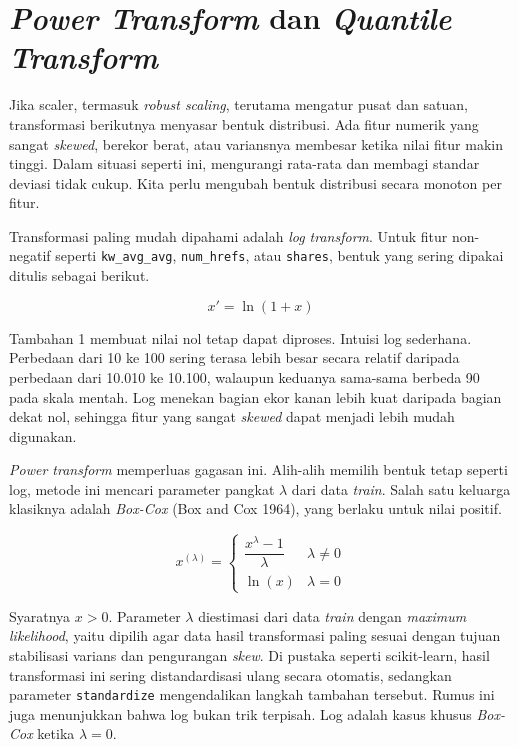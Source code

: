 \section{\texorpdfstring{\emph{Power Transform} dan \emph{Quantile Transform}}{Power Transform dan Quantile Transform}}\label{power-transform-dan-quantile-transform}

Jika scaler, termasuk \emph{robust scaling}, terutama mengatur pusat dan satuan, transformasi berikutnya menyasar bentuk distribusi. Ada fitur numerik yang sangat \emph{skewed}, berekor berat, atau variansnya membesar ketika nilai fitur makin tinggi. Dalam situasi seperti ini, mengurangi rata-rata dan membagi standar deviasi tidak cukup. Kita perlu mengubah bentuk distribusi secara monoton per fitur.

Transformasi paling mudah dipahami adalah \emph{log transform}. Untuk fitur non-negatif seperti \passthrough{\lstinline!kw_avg_avg!}, \passthrough{\lstinline!num_hrefs!}, atau \passthrough{\lstinline!shares!}, bentuk yang sering dipakai ditulis sebagai berikut.

\[
x' = \ln(1 + x)
\]

Tambahan 1 membuat nilai nol tetap dapat diproses. Intuisi log sederhana. Perbedaan dari 10 ke 100 sering terasa lebih besar secara relatif daripada perbedaan dari 10.010 ke 10.100, walaupun keduanya sama-sama berbeda 90 pada skala mentah. Log menekan bagian ekor kanan lebih kuat daripada bagian dekat nol, sehingga fitur yang sangat \emph{skewed} dapat menjadi lebih mudah digunakan.

\emph{Power transform} memperluas gagasan ini. Alih-alih memilih bentuk tetap seperti log, metode ini mencari parameter pangkat \(\lambda\) dari data \emph{train}. Salah satu keluarga klasiknya adalah \emph{Box-Cox} (Box and Cox 1964), yang berlaku untuk nilai positif.

\[
x^{(\lambda)} = \begin{cases} \dfrac{x^{\lambda} - 1}{\lambda} & \lambda \neq 0 \\[4pt] \ln(x) & \lambda = 0 \end{cases}
\]

Syaratnya \(x > 0\). Parameter \(\lambda\) diestimasi dari data \emph{train} dengan \emph{maximum likelihood}, yaitu dipilih agar data hasil transformasi paling sesuai dengan tujuan stabilisasi varians dan pengurangan \emph{skew}. Di pustaka seperti scikit-learn, hasil transformasi ini sering distandardisasi ulang secara otomatis, sedangkan parameter \passthrough{\lstinline!standardize!} mengendalikan langkah tambahan tersebut. Rumus ini juga menunjukkan bahwa log bukan trik terpisah. Log adalah kasus khusus \emph{Box-Cox} ketika \(\lambda = 0\).

